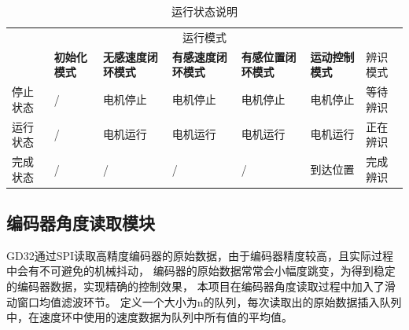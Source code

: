 ﻿\documentclass[12pt,a4paper]{article}
\begin{document}
\begin{table}[!htbp]
  \centering
  \caption{运行状态说明}
  \label{software2}
  \begin{tabularx}{\textwidth}{lXXXXXX}
    \toprule
         & \multicolumn{5}{c}{运行模式}                                                                                      \\
    \cmidrule{2-7}
         & \textbf{初始化模式}           & \textbf{无感速度闭环模式} & \textbf{有感速度闭环模式} & \textbf{有感位置闭环模式} & \textbf{运动控制模式} & 辨识模式 \\
    \midrule
    停止状态 & /                        & 电机停止              & 电机停止              & 电机停止              & 电机停止            & 等待辨识 \\
    运行状态 & /                        & 电机运行              & 电机运行              & 电机运行              & 电机运行            & 正在辨识 \\
    完成状态 & /                        & /                 & /                 & /                 & 到达位置            & 完成辨识 \\
    \bottomrule
  \end{tabularx}%
\end{table}%



\subsection{编码器角度读取模块}
GD32通过SPI读取高精度编码器的原始数据，由于编码器精度较高，且实际过程中会有不可避免的机械抖动，
编码器的原始数据常常会小幅度跳变，为得到稳定的编码器数据，实现精确的控制效果，
本项目在编码器角度读取过程中加入了滑动窗口均值滤波环节。
定义一个大小为n的队列，每次读取出的原始数据插入队列中，在速度环中使用的速度数据为队列中所有值的平均值。




\end{document}
